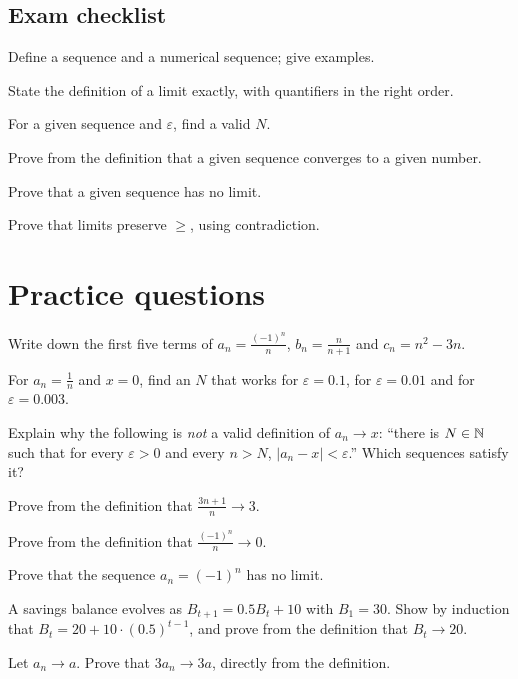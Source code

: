 \subsection*{Exam checklist}
\begin{checklist}
  \item Define a sequence and a numerical sequence; give examples.
  \item State the definition of a limit exactly, with quantifiers in the right order.
  \item For a given sequence and $\varepsilon$, find a valid $N$.
  \item Prove from the definition that a given sequence converges to a given number.
  \item Prove that a given sequence has no limit.
  \item Prove that limits preserve $\ge$, using contradiction.
\end{checklist}

\section{Practice questions}
\pq[basic] Write down the first five terms of $a_n=\frac{(-1)^n}{n}$, $b_n=\frac{n}{n+1}$ and $c_n=n^2-3n$.

\pq[basic] For $a_n=\frac1n$ and $x=0$, find an $N$ that works for $\varepsilon=0.1$, for $\varepsilon=0.01$ and for $\varepsilon=0.003$.

\pq[conceptual] Explain why the following is \emph{not} a valid definition of $a_n\to x$: ``there is $N\in\mathbb{N}$ such that for every
$\varepsilon>0$ and every $n>N$, $|a_n-x|<\varepsilon$.'' Which sequences satisfy it?

\pq[mathematical] Prove from the definition that $\frac{3n+1}{n}\to3$.

\pq[mathematical] Prove from the definition that $\frac{(-1)^n}{n}\to0$.

\pq[mathematical] Prove that the sequence $a_n=(-1)^n$ has no limit.

\pq[application] A savings balance evolves as $B_{t+1}=0.5B_t+10$ with $B_1=30$. Show by induction that $B_t=20+10\cdot(0.5)^{t-1}$,
and prove from the definition that $B_t\to20$.

 Let $a_n\to a$. Prove that $3a_n\to3a$, directly from the definition.


